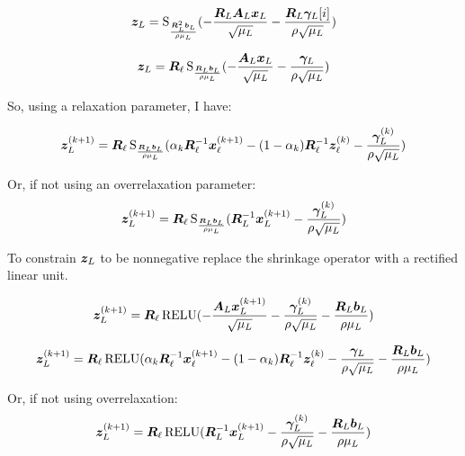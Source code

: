 \begin{equation}
\bm{z}_L = \operatorname{S}_{\frac{\bm{R}_L^2\bm{b}_L}{\rho\mu_L}}(-\frac{\bm{R}_L\bm{A}_L\bm{x}_L}{\sqrt{\mu_L}} - \frac{\bm{R}_L\bm{\gamma}_L[i]}{\rho\sqrt{\mu_L}})
\end{equation}

\begin{equation}
\bm{z}_L = \bm{R}_{\ell}\operatorname{S}_{\frac{\bm{R}_L\bm{b}_L}{\rho\mu_L}}(-\frac{\bm{A}_L\bm{x}_L}{\sqrt{\mu_L}} - \frac{\bm{\gamma}_L}{\rho\sqrt{\mu_L}})
\end{equation}

So, using a relaxation parameter, I have:

\begin{equation}
\bm{z}_L^{(k + 1)} = \bm{R}_{\ell}\operatorname{S}_{\frac{\bm{R}_L\bm{b}_L}{\rho\mu_L}}(\alpha_k\bm{R}_{\ell}^{-1}\bm{x}_{\ell}^{(k + 1)} - (1 - \alpha_k)\bm{R}_{\ell}^{-1}\bm{z}_{\ell}^{(k)} - \frac{\bm{\gamma}_L^{(k)}}{\rho\sqrt{\mu_L}})
\end{equation}

Or, if not using an overrelaxation parameter:
\begin{equation}
\bm{z}_L^{(k + 1)} = \bm{R}_{\ell}\operatorname{S}_{\frac{\bm{R}_L\bm{b}_L}{\rho\mu_L}}(\bm{R}_L^{-1}\bm{x}_L^{(k + 1)} - \frac{\bm{\gamma}_L^{(k)}}{\rho\sqrt{\mu_L}})
\end{equation}


To constrain $\bm{z}_L$ to be nonnegative replace the shrinkage operator with a rectified linear unit.

\begin{equation}
\bm{z}_L^{(k + 1)} = \bm{R}_{\ell}\operatorname{RELU}(-\frac{\bm{A}_L\bm{x}_L^{(k + 1)}}{\sqrt{\mu_L}} - \frac{\bm{\gamma}_L^{(k)}}{\rho\sqrt{\mu_L}} - \frac{\bm{R}_L\bm{b}_L}{\rho\mu_L})
\end{equation}

\begin{equation}
\bm{z}_L^{(k + 1)} = \bm{R}_{\ell}\operatorname{RELU}(\alpha_k\bm{R}_{\ell}^{-1}\bm{x}_{\ell}^{(k + 1)} - (1 - \alpha_k)\bm{R}_{\ell}^{-1}\bm{z}_{\ell}^{(k)} - \frac{\bm{\gamma}_L}{\rho\sqrt{\mu_L}} - \frac{\bm{R}_L\bm{b}_L}{\rho\mu_L})
\end{equation}



Or, if not using overrelaxation:
\begin{equation}
\bm{z}_L^{(k + 1)} = \bm{R}_{\ell}\operatorname{RELU}(\bm{R}_L^{-1}\bm{x}_L^{(k + 1)} - \frac{\bm{\gamma}_L^{(k)}}{\rho\sqrt{\mu_L}} - \frac{\bm{R}_L\bm{b}_L}{\rho\mu_L})
\end{equation}



